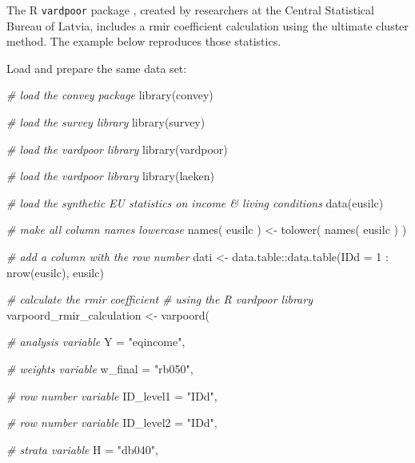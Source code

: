 \documentclass[
]{book}
\newenvironment{Shaded}{\begin{snugshade}}{\end{snugshade}}
\newcommand{\AttributeTok}[1]{\textcolor[rgb]{0.77,0.63,0.00}{#1}}
\newcommand{\CommentTok}[1]{\textcolor[rgb]{0.56,0.35,0.01}{\textit{#1}}}
\newcommand{\DecValTok}[1]{\textcolor[rgb]{0.00,0.00,0.81}{#1}}
\newcommand{\FunctionTok}[1]{\textcolor[rgb]{0.00,0.00,0.00}{#1}}
\newcommand{\NormalTok}[1]{#1}
\newcommand{\OtherTok}[1]{\textcolor[rgb]{0.56,0.35,0.01}{#1}}
\newcommand{\SpecialCharTok}[1]{\textcolor[rgb]{0.00,0.00,0.00}{#1}}
\newcommand{\StringTok}[1]{\textcolor[rgb]{0.31,0.60,0.02}{#1}}
\begin{document}
The R \texttt{vardpoor} package \autocite{vardpoor}, created by researchers at the Central Statistical Bureau of Latvia, includes a rmir coefficient calculation using the ultimate cluster method. The example below reproduces those statistics.

Load and prepare the same data set:

\begin{Shaded}
\begin{Highlighting}[]
\CommentTok{\# load the convey package}
\FunctionTok{library}\NormalTok{(convey)}

\CommentTok{\# load the survey library}
\FunctionTok{library}\NormalTok{(survey)}

\CommentTok{\# load the vardpoor library}
\FunctionTok{library}\NormalTok{(vardpoor)}

\CommentTok{\# load the vardpoor library}
\FunctionTok{library}\NormalTok{(laeken)}

\CommentTok{\# load the synthetic EU statistics on income \& living conditions}
\FunctionTok{data}\NormalTok{(eusilc)}

\CommentTok{\# make all column names lowercase}
\FunctionTok{names}\NormalTok{( eusilc ) }\OtherTok{\textless{}{-}} \FunctionTok{tolower}\NormalTok{( }\FunctionTok{names}\NormalTok{( eusilc ) )}

\CommentTok{\# add a column with the row number}
\NormalTok{dati }\OtherTok{\textless{}{-}}\NormalTok{ data.table}\SpecialCharTok{::}\FunctionTok{data.table}\NormalTok{(}\AttributeTok{IDd =} \DecValTok{1} \SpecialCharTok{:} \FunctionTok{nrow}\NormalTok{(eusilc), eusilc)}

\CommentTok{\# calculate the rmir coefficient}
\CommentTok{\# using the R vardpoor library}
\NormalTok{varpoord\_rmir\_calculation }\OtherTok{\textless{}{-}}
    \FunctionTok{varpoord}\NormalTok{(}
    
        \CommentTok{\# analysis variable}
        \AttributeTok{Y =} \StringTok{"eqincome"}\NormalTok{, }
        
        \CommentTok{\# weights variable}
        \AttributeTok{w\_final =} \StringTok{"rb050"}\NormalTok{,}
        
        \CommentTok{\# row number variable}
        \AttributeTok{ID\_level1 =} \StringTok{"IDd"}\NormalTok{,}
        
        \CommentTok{\# row number variable}
        \AttributeTok{ID\_level2 =} \StringTok{"IDd"}\NormalTok{,}
        
        \CommentTok{\# strata variable}
        \AttributeTok{H =} \StringTok{"db040"}\NormalTok{, }
        

\end{Highlighting}
\end{Shaded}
\end{document}
